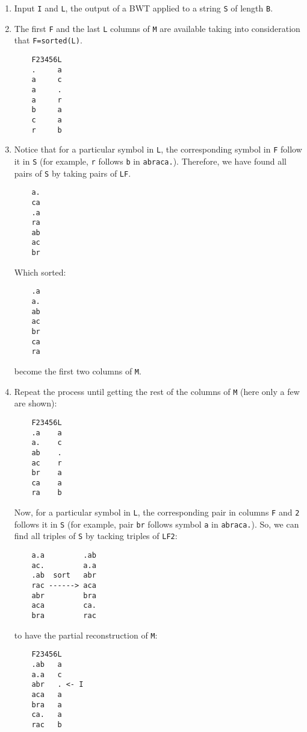 \begin{enumerate}
\item
  Input \texttt{I} and \texttt{L}, the output of a BWT applied to a
  string \texttt{S} of length \texttt{B}.
\item
  The first \texttt{F} and the last \texttt{L} columns of \texttt{M} are
  available taking into consideration that \texttt{F=sorted(L)}.
\begin{verbatim}
    F23456L
    .     a
    a     c
    a     .
    a     r
    b     a
    c     a
    r     b
\end{verbatim}

\item
  Notice that for a particular symbol in \texttt{L}, the corresponding
  symbol in \texttt{F} follow it in \texttt{S} (for example, \texttt{r}
  follows \texttt{b} in \texttt{abraca.}). Therefore, we have found all
  pairs of \texttt{S} by taking pairs of \texttt{LF}.
\begin{verbatim}
    a.
    ca
    .a
    ra
    ab
    ac
    br
\end{verbatim}
Which sorted:
\begin{verbatim}
    .a
    a.
    ab
    ac
    br
    ca
    ra
\end{verbatim}
  become the first two columns of \texttt{M}.
\item
  Repeat the process until getting the rest of the columns of \texttt{M}
  (here only a few are shown):

\begin{verbatim}
    F23456L
    .a    a
    a.    c
    ab    .
    ac    r
    br    a
    ca    a
    ra    b
\end{verbatim}

  Now, for a particular symbol in \texttt{L}, the corresponding pair in
  columns \texttt{F} and \texttt{2} follows it in \texttt{S} (for
  example, pair \texttt{br} follows symbol \texttt{a} in
  \texttt{abraca.}). So, we can find all triples of \texttt{S} by
  tacking triples of \texttt{LF2}:
\begin{verbatim}
    a.a         .ab
    ac.         a.a
    .ab  sort   abr
    rac ------> aca
    abr         bra
    aca         ca.
    bra         rac
\end{verbatim}
to have the partial reconstruction of \texttt{M}:
\begin{verbatim}
    F23456L
    .ab   a
    a.a   c
    abr   . <- I
    aca   a
    bra   a
    ca.   a
    rac   b
\end{verbatim}

\end{enumerate}

